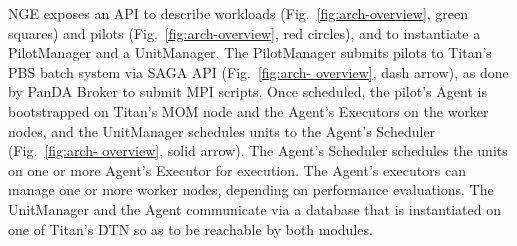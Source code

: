 

NGE exposes an API to describe workloads (Fig.~\ref{fig:arch-overview}, green
squares) and pilots (Fig.~\ref{fig:arch-overview}, red circles), and to
instantiate a PilotManager and a UnitManager.   The PilotManager submits
pilots to Titan's PBS  batch system via SAGA API (Fig.~\ref{fig:arch-
overview}, dash arrow), as done by PanDA Broker to submit MPI scripts. Once
scheduled, the pilot's Agent is bootstrapped on Titan's MOM node and
 the Agent's Executors on the worker
nodes, and the UnitManager schedules units to the Agent's Scheduler
(Fig.~\ref{fig:arch- overview}, solid arrow). The Agent's Scheduler schedules
the units on one or more Agent's Executor for execution. The Agent's executors
can manage one or more worker nodes, depending on performance evaluations. The
UnitManager and the Agent communicate via a database that is instantiated on
one of Titan's DTN so as to be reachable by both modules.





